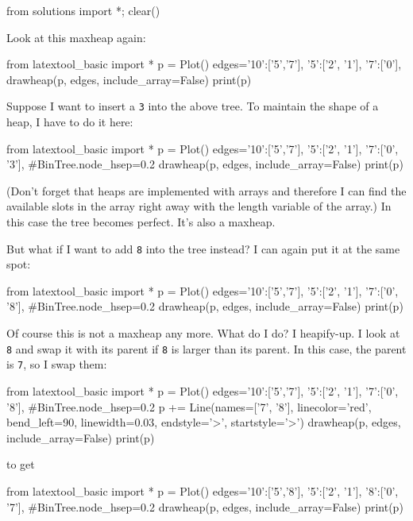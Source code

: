 \begin{python0}
from solutions import *; clear()
\end{python0}

Look at this maxheap again:

\begin{python}
from latextool_basic import *
p = Plot()
edges={'10':['5','7'],
       '5':['2', '1'],
       '7':['0'],
       }
drawheap(p, edges, include_array=False)
print(p)
\end{python}

Suppose I want to insert a \verb!3! into the above tree.
To maintain the shape of a heap, I have to do it here:

\begin{python}
from latextool_basic import *
p = Plot()
edges={'10':['5','7'],
       '5':['2', '1'],
       '7':['0', '3'],
     }
#BinTree.node_hsep=0.2
drawheap(p, edges, include_array=False)
print(p)
\end{python}


(Don't forget that heaps are implemented with arrays
and therefore I can find the available slots in the array
right away with the length variable of the array.)
In this case the tree becomes perfect.
It's also a maxheap.

But what if I want to add \verb!8! into the tree instead?
I can again put it at the same spot:

\begin{python}
from latextool_basic import *
p = Plot()
edges={'10':['5','7'],
       '5':['2', '1'],
       '7':['0', '8'],
     }
#BinTree.node_hsep=0.2
drawheap(p, edges, include_array=False)
print(p)
\end{python}

Of course this is not a maxheap any more.
What do I do?
I heapify-up.
I look at \verb!8!
and swap it with its parent if \verb!8! is larger than
its parent.
In this case, the parent is \verb!7!, so I swap them:

\begin{python}
from latextool_basic import *
p = Plot()
edges={'10':['5','7'],
       '5':['2', '1'],
       '7':['0', '8'],
     }
#BinTree.node_hsep=0.2
p += Line(names=['7', '8'], linecolor='red', bend_left=90,
          linewidth=0.03, endstyle='>', startstyle='>')
drawheap(p, edges, include_array=False)
print(p)
\end{python}

to get

\begin{python}
from latextool_basic import *
p = Plot()
edges={'10':['5','8'],
       '5':['2', '1'],
       '8':['0', '7'],
     }
#BinTree.node_hsep=0.2
drawheap(p, edges, include_array=False)
print(p)
\end{python}

